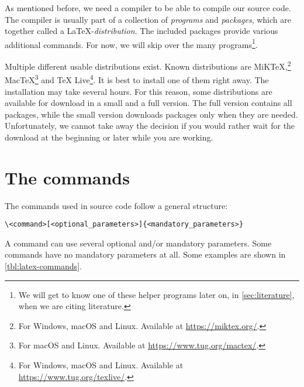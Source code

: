 As mentioned before, we need a compiler to be able to compile our source code.
The compiler is usually part of a collection of \emph{programs} and \emph{packages}, which are together called a \LaTeX-\emph{distribution}. The included packages provide various additional commands. For now, we will skip over the many programs\footnote{We will get to know one of these helper programs later on, in \ref{sec:literature}, when we are citing literature.}. 

Multiple different usable distributions exist. Known distributions are MiK\TeX,\footnote{For Windows, macOS and Linux. Available at \url{https://miktex.org/}.} Mac\TeX\footnote{For macOS and Linux. Available at \url{https://www.tug.org/mactex/}.} and \TeX{} Live\footnote{For Windows, macOS and Linux. Available at \url{https://www.tug.org/texlive/}.}. It is best to install one of them right away. The installation may take several hours. For this reason, some distributions are available for download in a small and a full version. 
The full version contains all packages, while the small version downloads packages only when they are needed.
Unfortunately, we cannot take away the decision if you would rather wait for the download at the beginning or later while you are working. %


\section{The commands}
\label{subsec:command-structure}
The commands used in source code follow a general structure:
\begin{verbatim}
\<command>[<optional_parameters>]{<mandatory_parameters>}
\end{verbatim}
A command can use several optional and/or mandatory parameters. Some commands have no mandatory parameters at all. Some examples are shown in \cref{tbl:latex-commands}.

